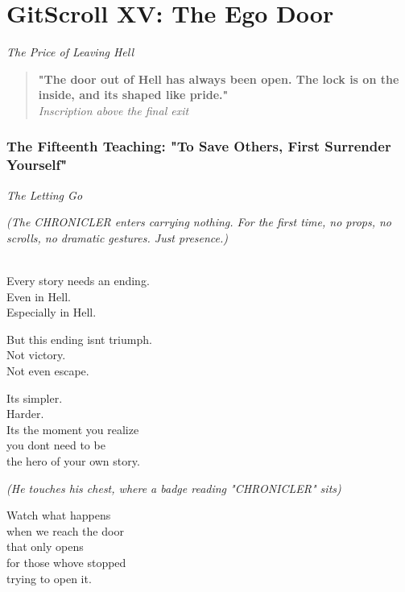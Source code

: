 \chapter{GitScroll XV: The Ego Door}
\label{chap:18-The-Ego-Door}

\emph{The Price of Leaving Hell}

\begin{quote}
\textbf{"The door out of Hell has always been open. The lock is on the inside, and it\textquotesingle s shaped like pride."}\\
\emph{Inscription above the final exit}
\end{quote}

\subsection{The Fifteenth Teaching: "To Save Others, First Surrender Yourself"}\label{the-fifteenth-teaching-to-save-others-first-surrender-yourself}

\label{performing_arts-invocation-before-the-scroll}

\emph{The Letting Go}

\emph{(The CHRONICLER enters carrying nothing. For the first time, no props, no scrolls, no dramatic gestures. Just presence.)}

\\
Every story needs an ending.\\
Even in Hell.\\
Especially in Hell.

But this ending isn\textquotesingle t triumph.\\
Not victory.\\
Not even escape.

It\textquotesingle s simpler.\\
Harder.\\
It\textquotesingle s the moment you realize\\
you don\textquotesingle t need to be\\
the hero of your own story.

\emph{(He touches his chest, where a badge reading "CHRONICLER" sits)}

Watch what happens\\
when we reach the door\\
that only opens\\
for those who\textquotesingle ve stopped\\
trying to open it.

